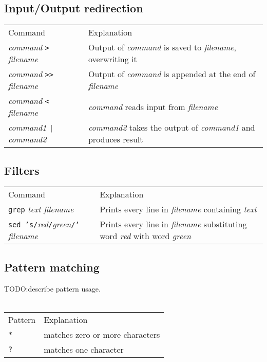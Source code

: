 \subsection{Input/Output redirection}
\begin{tabular}{ll}
  Command & Explanation \\
  \hhline{==}
  \textit{command} \texttt{>} \textit{filename} & Output of \textit{command} is saved to \textit{filename}, overwriting it \\
  \textit{command} \texttt{>>} \textit{filename} & Output of \textit{command} is appended at the end of \textit{filename} \\
  \textit{command} \texttt{<} \textit{filename} & \textit{command} reads input from \textit{filename} \\
  \textit{command1} \texttt{|} \textit{command2} & \textit{command2} takes the output of \textit{command1} and produces result \\  
\end{tabular}

\subsection{Filters}
\begin{tabular}{ll}
  Command & Explanation \\
  \hhline{==}
  \texttt{grep} \textit{text filename} & Prints every line in \textit{filename} containing \textit{text} \\
  \texttt{sed 's/}\textit{red}\texttt{/}\textit{green}\texttt{/'} \textit{filename} & Prints every line in \textit{filename} 
     substituting word \textit{red} with word \textit{green} 
\end{tabular}

\subsection{Pattern matching}
TODO:describe pattern usage. \\~\\
\begin{tabular}{ll}
  Pattern & Explanation \\
  \hhline{==}
  \texttt{*} & matches zero or more characters \\
  \texttt{?} & matches one character \\
\end{tabular}

